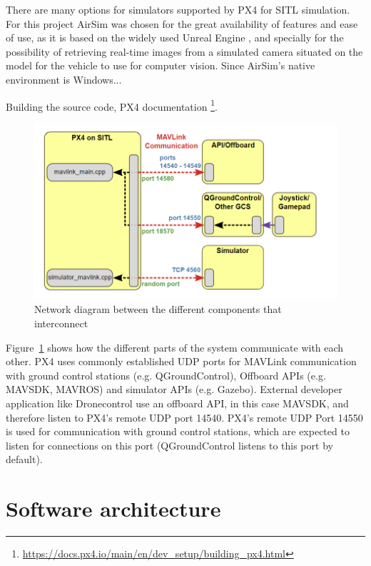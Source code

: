 There are many options for simulators supported by PX4 for SITL simulation.
For this project AirSim  was chosen for the great availability of features and ease of use, as it is based on the widely used Unreal Engine , and specially for the possibility of retrieving real-time images from a simulated camera situated on the model for the vehicle to use for computer vision.
Since AirSim's native environment is Windows...

Building the source code, PX4 documentation \footnote{\url{https://docs.px4.io/main/en/dev_setup/building_px4.html}}.

\begin{figure}
  \centering
  \includegraphics[keepaspectratio]{img/px4_ports.png}
  \caption{Network diagram between the different components that interconnect}\label{fig:px4_ports}
\end{figure}

Figure~\ref{fig:px4_ports} shows how the different parts of the system communicate with each other.
PX4 uses commonly established UDP ports for MAVLink communication with ground control stations (e.g. QGroundControl), Offboard APIs (e.g. MAVSDK, MAVROS) and simulator APIs (e.g. Gazebo).
External developer application like Dronecontrol use an offboard API, in this case MAVSDK, and therefore listen to PX4's remote UDP port 14540.
PX4's remote UDP Port 14550 is used for communication with ground control stations, which are expected to listen for connections on this port (QGroundControl listens to this port by default).

\section{Software architecture}

